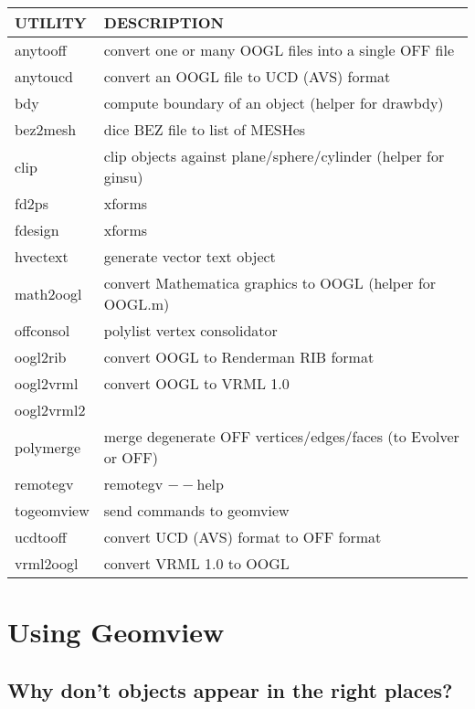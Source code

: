 \documentclass[12pt,a4paper]{article}
\begin{document}
        \begin{center}
        \begin{tabular}{|l|p{8cm}|}
        \hline
        UTILITY & DESCRIPTION \\ \hline
        anytooff & convert one or many OOGL files into a single OFF file \\ \hline
        anytoucd & convert an OOGL file to UCD (AVS) format \\ \hline
        bdy & compute boundary of an object (helper for drawbdy) \\ \hline
        bez2mesh & dice BEZ file to list of MESHes \\ \hline
        clip & clip objects against plane/sphere/cylinder (helper for ginsu) \\ \hline
        fd2ps & xforms \\ \hline
        fdesign & xforms \\ \hline
        hvectext & generate vector text object \\ \hline
        math2oogl & convert Mathematica graphics to OOGL (helper for OOGL.m) \\ \hline
        offconsol & polylist vertex consolidator \\ \hline
        oogl2rib & convert OOGL to Renderman RIB format \\ \hline
        oogl2vrml & convert OOGL to VRML 1.0 \\ \hline
        oogl2vrml2 &  \\ \hline
        polymerge & merge degenerate OFF vertices/edges/faces (to Evolver or OFF) \\ \hline
        remotegv & remotegv $--$help \\ \hline
        togeomview & send commands to geomview \\ \hline
        ucdtooff & convert UCD (AVS) format to OFF format \\ \hline
        vrml2oogl & convert VRML 1.0 to OOGL \\ \hline
        \end{tabular}
	\end{center}

\section{Using Geomview}

    \subsection{Why don't objects appear in the right places?}
\end{document}
